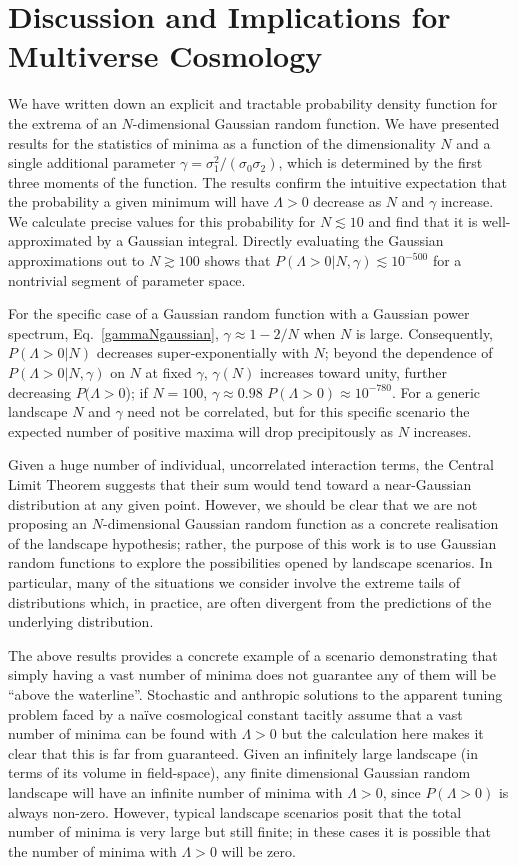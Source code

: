 \documentclass[12pt]{article}
\begin{document}
 
\section{Discussion and Implications for Multiverse Cosmology}

 We have  written down an explicit and tractable probability density function for the extrema of an $N$-dimensional  Gaussian random function. We have presented results for the statistics of minima as a function of the dimensionality $N$ and a single additional parameter $\gamma=\sigma_1^2/(\sigma_0\sigma_2)$, which is determined by the first three moments of the function. The results confirm the intuitive expectation that the probability a given minimum will have $\Lambda > 0$ decrease as $N$ and $\gamma$ increase. We calculate precise values for this probability for $N \lesssim10$ and find that it is well-approximated by a Gaussian integral. Directly evaluating the Gaussian approximations out to $N \gtrsim 100$ shows that $P(\Lambda > 0| N, \gamma) \lesssim 10^{-500}$ for a nontrivial segment of parameter space.  

For the specific case of a Gaussian random function with a Gaussian power spectrum, Eq.~\ref{gammaNgaussian}, $\gamma \approx 1 -2 /N$ when $N$ is large.  Consequently, $P(\Lambda>0 | N)$ decreases super-exponentially with $N$; beyond the dependence of $P(\Lambda>0 | N,\gamma)$ on $N$ at fixed $\gamma$,  $\gamma(N)$ increases toward unity, further decreasing $P(\Lambda>0$); if $N=100$, $\gamma \approx 0.98$ $P(\Lambda>0) \approx 10^{-780}$. For a generic landscape $N$ and $\gamma$ need not be correlated, but for this specific scenario the expected number of positive maxima will drop precipitously as $N$ increases.


Given a huge number of individual, uncorrelated interaction terms, the Central Limit Theorem suggests that their sum would tend toward a near-Gaussian distribution at any given point. However, we should be clear that we are not proposing an $N$-dimensional Gaussian random function as a concrete realisation of the landscape hypothesis; rather, the purpose of this work is to use Gaussian random functions to explore the possibilities opened by landscape scenarios. In particular, many of the situations we consider involve the extreme tails of distributions which, in practice, are often divergent from the predictions of the underlying distribution.

The above results provides a concrete example of a scenario demonstrating that simply having a vast number of minima does not guarantee any of them will be ``above the waterline''.  Stochastic and anthropic solutions to the apparent tuning problem faced by a na\"ive cosmological constant tacitly assume that a vast number of minima can be found with $\Lambda>0$ but the calculation here makes it clear that this is far from guaranteed. Given an infinitely large landscape (in terms of its volume in field-space), any finite dimensional Gaussian random landscape will have an infinite number of minima with $\Lambda>0$, since $P(\Lambda >0)$ is always non-zero. However, typical landscape scenarios posit that the total number of minima is very large but still finite; in these cases it is possible that the number of minima with $\Lambda >0$ will be zero.  
\end{document}
